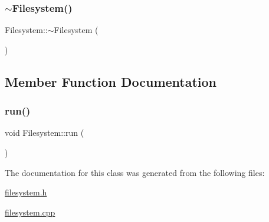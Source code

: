 \mbox{\label{class_filesystem_a8d4d73d3d4e56fd6792bdb83f6c5dfd8}} 
\subsubsection{\texorpdfstring{$\sim$\+Filesystem()}{~Filesystem()}}
{\footnotesize\ttfamily Filesystem\+::$\sim$\+Filesystem (\begin{DoxyParamCaption}{ }\end{DoxyParamCaption})\hspace{0.3cm}{\ttfamily [inline]}}



\subsection{Member Function Documentation}
\mbox{\label{class_filesystem_a373c34da491ec8d269cbc18d52a1ad79}} 
\subsubsection{\texorpdfstring{run()}{run()}}
{\footnotesize\ttfamily void Filesystem\+::run (\begin{DoxyParamCaption}{ }\end{DoxyParamCaption})}



The documentation for this class was generated from the following files\+:\begin{DoxyCompactItemize}
\item 
\hyperlink{filesystem_8h}{filesystem.\+h}\item 
\hyperlink{filesystem_8cpp}{filesystem.\+cpp}\end{DoxyCompactItemize}
